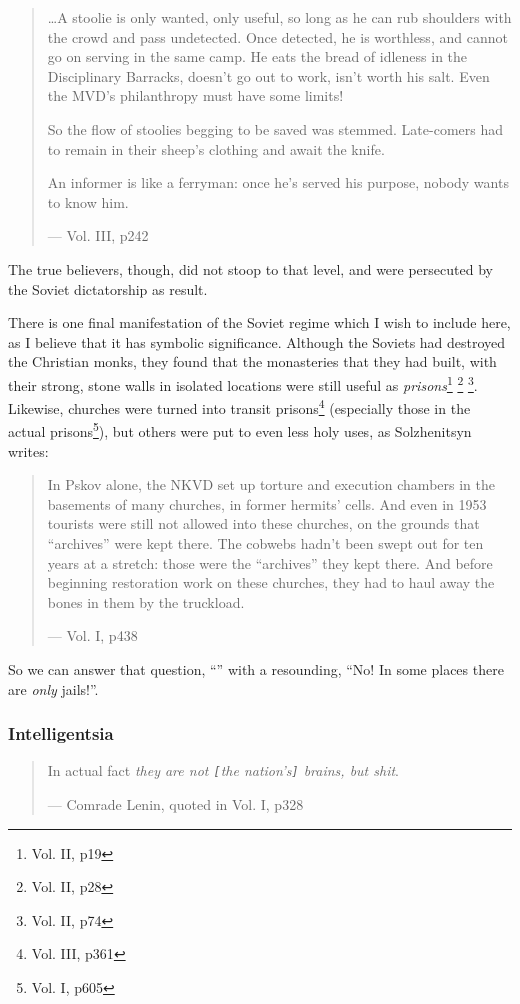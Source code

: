 \documentclass{article}
\begin{document}
\begin{quote}
\ldots A stoolie is only wanted, only useful, so long as he can rub shoulders with the crowd and pass undetected.  Once detected, he is worthless, and cannot go on serving in the same camp.  He eats the bread of idleness in the Disciplinary Barracks, doesn't go out to work, isn't worth his salt.  Even the MVD's philanthropy must have some limits!

So the flow of stoolies begging to be saved was stemmed.  Late-comers had to remain in their sheep's clothing and await the knife.

An informer is like a ferryman: once he's served his purpose, nobody wants to know him.

--- Vol. III, p242
\end{quote}

The true believers, though, did not stoop to that level, and were persecuted by the Soviet dictatorship as result.

There is one final manifestation of the Soviet regime which I wish to include here, as I believe that it has symbolic significance.  Although the Soviets had destroyed the Christian monks, they found that the monasteries that they had built, with their strong, stone walls in isolated locations were still useful as \emph{prisons}\footnote{Vol. II, p19} \footnote{Vol. II, p28} \footnote{Vol. II, p74}.  Likewise, churches were turned into transit prisons\footnote{Vol. III, p361} (especially those in the actual prisons\footnote{Vol. I, p605}), but others were put to even less holy uses, as Solzhenitsyn writes:

\begin{quote}
In Pskov alone, the NKVD set up torture and execution chambers in the basements of many churches, in former hermits' cells.  And even in 1953 tourists were still not allowed into these churches, on the grounds that ``archives'' were kept there.  The cobwebs hadn't been swept out for ten years at a stretch: those were the ``archives'' they kept there.  And before beginning restoration work on these churches, they had to haul away the bones in them by the truckload.

--- Vol. I, p438
\end{quote}

So we can answer that question, ``'' with a resounding, ``No!  In some places there are \emph{only} jails!''.

\subsubsection{Intelligentsia}
\begin{quote}
In actual fact \emph{they are not \verb|[|the nation's\verb|]| brains, but shit}.

--- Comrade Lenin, quoted in Vol. I, p328
\end{quote}
\end{document}
